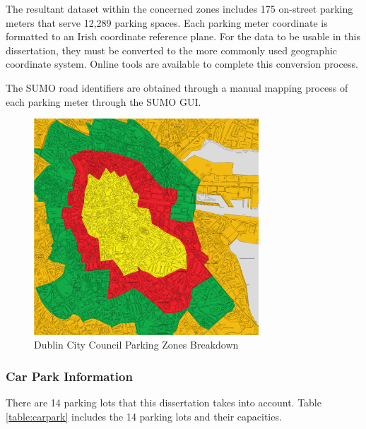 The resultant dataset within the concerned zones includes 175 on-street parking meters that serve 12,289 parking spaces. Each parking meter coordinate is formatted to an Irish coordinate reference plane. For the data to be usable in this dissertation, they must be converted to the more commonly used geographic coordinate system. Online tools are available to complete this conversion process.

The SUMO road identifiers are obtained through a manual mapping process of each parking meter through the SUMO GUI.

\begin{figure}[H]
    \centering
    \includegraphics[width=0.75\textwidth]{./Images/DUBLINZONES.PNG}
    \caption{Dublin City Council Parking Zones Breakdown \citep{DublinTariffs}}
    \label{fig:DUBLINZONES}
\end{figure}

\subsubsection{Car Park Information}\label{ssec:car_par_cap}
There are 14 parking lots that this dissertation takes into account. Table \ref{table:carpark} includes the 14 parking lots and their capacities.

